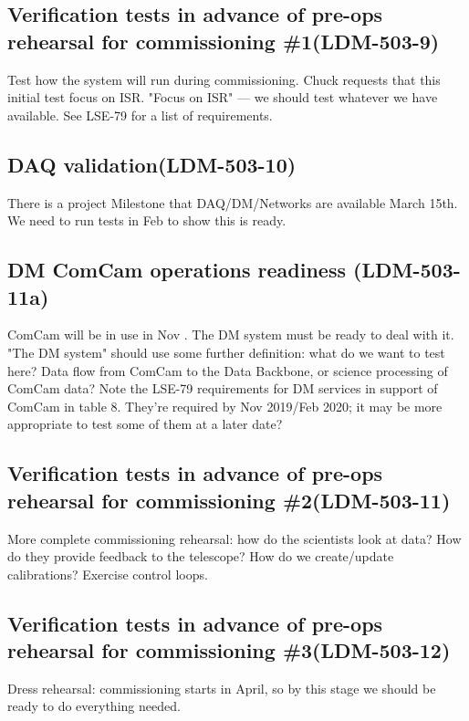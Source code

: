 \subsection{Verification tests in advance of pre-ops rehearsal for commissioning \#1\textbf{(LDM-503-9)}\label{LDM-503-9}}
 Test how the system will run during commissioning.
 Chuck requests that this initial test focus on ISR.
 \newline "Focus on ISR" — we should test whatever we have available. See LSE-79 for a list of requirements.
\subsection{ DAQ validation\textbf{(LDM-503-10)}\label{LDM-503-10}}
 There is a project Milestone that DAQ/DM/Networks are available March 15th. We need to run tests in Feb to show this is ready.
 \newline
\subsection{ DM ComCam operations readiness \textbf{(LDM-503-11a)}\label{LDM-503-11a}}
 ComCam will be in use in Nov . The DM system must be ready to deal with it.
 \newline "The DM system" should use some further definition: what do we want to test here? Data flow from ComCam to the Data Backbone, or science processing of ComCam data?
 Note the LSE-79 requirements for DM services in support of ComCam in table 8. They're required by Nov 2019/Feb 2020; it may be more appropriate to test some of them at a later date?
\subsection{Verification tests in advance of pre-ops rehearsal for commissioning \#2\textbf{(LDM-503-11)}\label{LDM-503-11}}
 More complete commissioning rehearsal: how do the scientists look at data? How do they provide feedback to the telescope? How do we create/update calibrations?
 Exercise control loops.
 \newline
\subsection{Verification tests in advance of pre-ops rehearsal for commissioning \#3\textbf{(LDM-503-12)}\label{LDM-503-12}}
 Dress rehearsal: commissioning starts in April, so by this stage we should be ready to do everything needed.
 \newline
